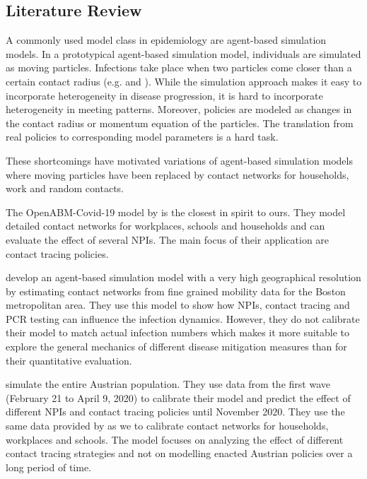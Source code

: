 \subsection{Literature Review}
\label{sec:literature_review}

A commonly used model class in epidemiology are agent-based simulation
models. In a prototypical agent-based simulation model, individuals are
simulated as moving particles. Infections take place when two particles come closer than
a certain contact radius (e.g. \citet{Silva2020} and \citet{Cuevas2020}). While the
simulation approach makes it easy to incorporate heterogeneity in disease progression, it
is hard to incorporate heterogeneity in meeting patterns. Moreover, policies are modeled
as changes in the contact radius or momentum equation of the particles. The translation
from real policies to corresponding model parameters is a hard task.

These shortcomings have motivated variations of agent-based simulation models where
moving particles have been replaced by contact networks for households, work and random
contacts.

The OpenABM-Covid-19 model by \citet{Hinch2020} is the closest in spirit to
ours. They model detailed
contact networks for workplaces, schools and households and can evaluate the effect of
several NPIs. The main focus of their application are contact tracing policies.

\citet{Aleta2020} develop an agent-based simulation model with a very high geographical
resolution by estimating contact networks from fine grained mobility data for the
Boston metropolitan area. They use this model to show how NPIs, contact tracing and PCR
testing can influence the infection dynamics. However, they do not calibrate their model
to match actual infection numbers which makes it more suitable to explore the general
mechanics of different disease mitigation measures than for their quantitative
evaluation.

\citet{Bicher2021} simulate the entire Austrian population. They use data from the first
wave (February 21 to April 9, 2020) to calibrate their model and predict the effect of
different NPIs and contact tracing policies until November 2020. They use the same data
provided by \citet{Mossong2008} as we to calibrate contact networks for households,
workplaces and schools. The model focuses on analyzing the effect of different contact
tracing strategies and not on modelling enacted Austrian policies over a long period
of time.

